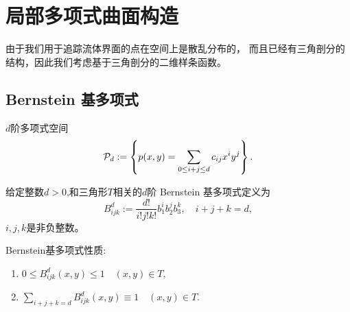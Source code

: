 \section{局部多项式曲面构造}
\begin{rem}
  由于我们用于追踪流体界面的点在空间上是散乱分布的，
  而且已经有三角剖分的结构，因此我们考虑基于三角剖分的二维样条函数。
\end{rem}
\subsection{Bernstein 基多项式}



\begin{nota}
  $d$阶多项式空间
  \begin{displaymath}
{\cal P}_d:=\left\{ p(x,y) = \sum_{0\leq i+j\leq d}c_{ij}x^iy^j\right\}.
  \end{displaymath}
\end{nota}
\begin{defn}
  给定整数$d>0$,和三角形$T$相关的$d$阶 Bernstein 基多项式定义为
  \begin{displaymath}
    B^d_{ijk}:=\frac{d!}{i!j!k!}b^i_1b_2^jb_3^k,\quad i+j+k=d,
  \end{displaymath}
  $i,j,k$是非负整数。
\end{defn}
\begin{prop}
  Bernstein基多项式性质:
  \begin{enumerate}
  \item $ 0\leq B_{ijk}^d(x,y)\leq 1 \quad (x,y) \in T,$
  \item $ \sum_{i+j+k=d}B_{ijk}^d(x,y) \equiv 1\quad (x,y)\in T.$
  \end{enumerate}
\end{prop}


